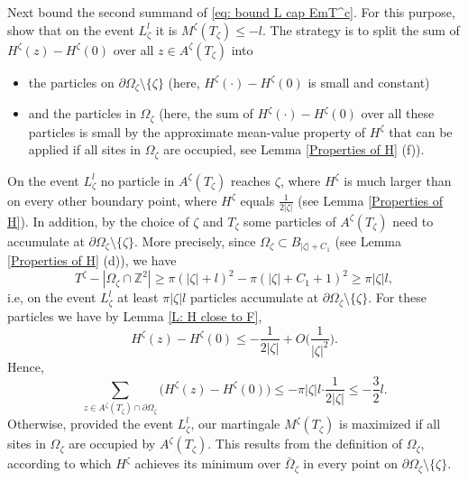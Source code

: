 \documentclass[11pt]{article}
\makeatletter
\renewenvironment{proof}[1][\proofname]{
   \par\pushQED{\qed}\normalfont
   \topsep6\p@\@plus6\p@\relax
   \trivlist\item[\hskip\labelsep\bfseries#1\@addpunct{.}]
   \ignorespaces
}{
   \popQED\endtrivlist\@endpefalse
}
\numberwithin{equation}{section}
\def\OZ{\Omega_{\zeta}}
\def\mydot{\boldsymbol{\cdot}}
\makeatother
\begin{document}
\begin{proof}[Proof of Lemma \ref{Late Points Imply Early Points}]
  Next bound the second summand of \eqref{eq: bound L cap EmT^c}.
  For this purpose, show that on the event
  $L^l_{\zeta}$ it is $M^{\zeta}(T_{\zeta}) \leq -l$.
  The strategy is to split the sum of $H^{\zeta}(z) - H^{\zeta}(0)$ 
  over all $z \in A^{\zeta}(T_{\zeta})$ into 
  \begin{itemize}
    \item
      the particles on $\partial \OZ \setminus \{\zeta\}$
      (here, $H^{\zeta}(\mydot) - H^{\zeta}(0)$ 
      is small and constant)
    \item
      and the particles in $\OZ$ (here, the sum of 
      $H^{\zeta}(\mydot) - H^{\zeta}(0)$ over all these particles 
      is small by the approximate mean-value property of $H^{\zeta}$ that can be applied if 
      all sites in $\OZ$ are occupied, see Lemma \ref{Properties of H} (f)).  
  \end{itemize}
  On the event $L^l_{\zeta}$ no particle in $A^{\zeta}(T_{\zeta})$ reaches $\zeta$, 
  where $H^{\zeta}$ is much larger than on every other boundary point, 
  where $H^{\zeta}$ equals $\frac{1}{2|\zeta|}$ (see Lemma \ref{Properties of H}). 
  In addition, by the choice of $\zeta$ and $T_{\zeta}$ 
  some particles of $A^{\zeta}(T_{\zeta})$ need to accumulate at $\partial \OZ \setminus \{\zeta\}$.
  More precisely, since $\OZ \subset B_{|\zeta| + C_1}$ (see Lemma \ref{Properties of H} (d)), 
  we have 
  \begin{equation} \nonumber
    T^{\zeta} - |\OZ \cap \mathbb{Z}^2| 
    \geq \pi(|\zeta| + l)^2 - \pi (|\zeta| + C_1 + 1)^2
    \geq \pi |\zeta| l,
  \end{equation}
  i.e, on the event $L^l_{\zeta}$ at least $\pi |\zeta| l$ particles 
  accumulate at $\partial \OZ \setminus \{\zeta\}$. 
  For these particles we have by Lemma \ref{L: H close to F},
  $$
    H^{\zeta}(z)-H^{\zeta}(0) 
    \leq - \frac{1}{2|\zeta|} + O \Big( \frac{1}{|\zeta|^2} \Big).
  $$
  Hence, 
  \begin{equation}\label{eq: sum over A^zeta cap Z}
    \sum_{z \in A^{\zeta}(T_{\zeta}) \cap \partial \OZ}
    \big( H^{\zeta}(z) - H^{\zeta}(0) \big) 
    \leq -\pi |\zeta| l \mydot \frac{1}{2|\zeta|} 
    \leq -\frac{3}{2} l. 
  \end{equation}
  Otherwise, provided the event $L^l_{\zeta}$, our martingale $M^{\zeta}(T_{\zeta})$ 
  is maximized if all sites in $\OZ$ are occupied by $A^{\zeta}(T_{\zeta})$. 
  This results from the definition of $\OZ$, according to which $H^{\zeta}$ achieves 
  its minimum over $\bar{\Omega}_{\zeta}$ in every point on \mbox{$\partial \OZ \setminus \{\zeta\}$}.

\end{proof}
\end{document}
